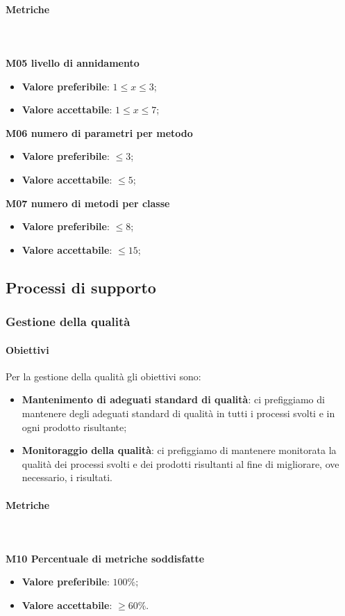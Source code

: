 			\paragraph{Metriche} \mbox{} \\ \\
			\textbf{M05 livello di annidamento} 
			\begin{itemize}
				\item \textbf{Valore preferibile}: $1 \le x \le 3$; 
				\item \textbf{Valore accettabile}: $1 \le x \le 7$; 
			\end{itemize}
			\textbf{M06 numero di parametri per metodo} 
			\begin{itemize}
				\item \textbf{Valore preferibile}: $ \le 3$;
				\item \textbf{Valore accettabile}: $ \le 5$;
			\end{itemize}			
			\textbf{M07 numero di metodi per classe} 
			\begin{itemize}
				\item \textbf{Valore preferibile}: $ \le 8$;
				\item \textbf{Valore accettabile}: $ \le 15$;
			\end{itemize}
	
			
	\subsection{Processi di supporto}			
		\subsubsection{Gestione della qualità}
			\paragraph{Obiettivi}
			Per la gestione della qualità gli obiettivi sono:
			\begin{itemize}
				\item \textbf{Mantenimento di adeguati standard di qualità}: ci prefiggiamo di mantenere degli adeguati standard di qualità in tutti i processi svolti e in ogni prodotto risultante;
				\item \textbf{Monitoraggio della qualità}: ci prefiggiamo di mantenere monitorata la qualità dei processi svolti e dei prodotti risultanti al fine di migliorare, ove necessario, i risultati.
			\end{itemize}	 
			\paragraph{Metriche} \mbox{} \\ \\
				\textbf{M10 Percentuale di metriche soddisfatte}
				\begin{itemize}
					\item \textbf{Valore preferibile}: $100\%$;
					\item \textbf{Valore accettabile}: $\ge 60\%$.
				\end{itemize}
			

